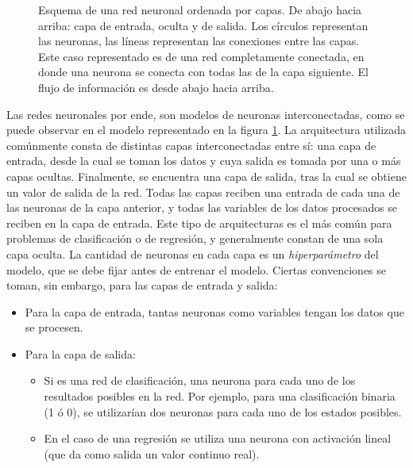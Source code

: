 \documentclass[12pt, spanish]{article}
\begin{document}
\begin{figure}[H]
\begin{tikzpicture}[x=0.75pt,y=0.75pt,yscale=-1,xscale=1]
\end{tikzpicture}
\caption{Esquema de una red neuronal ordenada por capas. De abajo hacia arriba:
capa de entrada, oculta y de salida. Los círculos representan las neuronas, las
líneas representan las conexiones entre las capas. Este caso representado es de
una red completamente conectada, en donde una neurona se conecta con todas las
de la capa siguiente. El flujo de información es desde abajo hacia arriba.}
\label{red_fully_connected}
\end{figure}

Las redes neuronales por ende, son modelos de neuronas interconectadas, como
se puede observar en el modelo representado en la figura \ref{red_fully_connected}.
La arquitectura utilizada comúnmente consta de distintas capas interconectadas
entre sí: una capa de entrada, desde la cual se toman los datos y cuya salida
es tomada por una o más capas ocultas. Finalmente, se encuentra una capa de
salida, tras la cual se obtiene un valor de salida de la red. Todas las capas
reciben una entrada de cada una de las neuronas de la capa anterior, y todas
las variables de los datos procesados se reciben en la capa de entrada.
Este tipo de arquitecturas es el más común para problemas de clasificación o de
regresión, y generalmente constan de una sola capa oculta.
La cantidad de neuronas en cada capa es un \textit{hiperparámetro} del modelo, que
se debe fijar antes de entrenar el modelo.
Ciertas convenciones se toman, sin embargo, para las capas de entrada y salida:
\begin{itemize}
    \item Para la capa de entrada, tantas neuronas como variables tengan los
        datos que se procesen.
    \item Para la capa de salida:
    \begin{itemize}
        \item Si es una red de clasificación, una neurona para cada uno de los
        resultados posibles en la red. Por ejemplo, para una clasificación binaria
        (1 ó 0), se utilizarían dos neuronas para cada uno de los estados posibles.
        \item En el caso de una regresión se utiliza una neurona con activación lineal
        (que da como salida un valor continuo real).
    \end{itemize}
\end{itemize}
\end{document}
